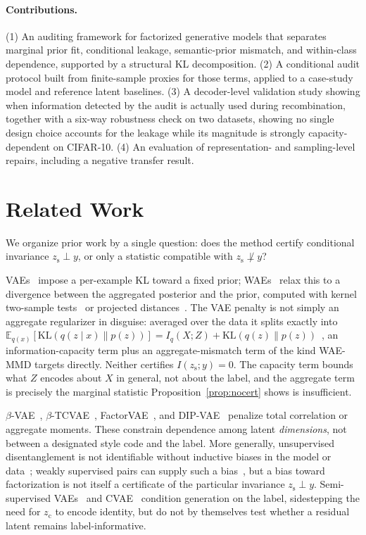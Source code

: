 \documentclass[letterpaper]{article}
\newcommand{\zc}{z_{\mathrm{c}}}
\newcommand{\zs}{z_{\mathrm{s}}}
\newcommand{\KL}{\mathrm{KL}}
\begin{document}
\paragraph{Contributions.}
(1) An auditing framework for factorized generative models that separates
marginal prior fit, conditional leakage, semantic-prior mismatch, and
within-class dependence, supported by a structural KL decomposition. (2) A
conditional audit protocol built from finite-sample proxies for those terms,
applied to a case-study model and reference latent baselines. (3) A
decoder-level validation study showing when information detected by the audit
is actually used during recombination, together with a
six-way robustness check on two datasets, showing no single design choice
accounts for the leakage while its magnitude is strongly capacity-dependent
on CIFAR-10. (4) An evaluation of representation- and sampling-level
repairs, including a negative transfer result.

\section{Related Work}

We organize prior work by a single question: does the method certify
conditional invariance $\zs\perp y$, or only a statistic compatible with
$\zs\not\perp y$?

VAEs~\citep{kingma2013autoencoding} impose a per-example KL toward a fixed
prior; WAEs~\citep{tolstikhin2017wasserstein} relax this to a divergence
between the aggregated posterior and the prior, computed with kernel
two-sample tests~\citep{gretton2012kernel} or projected
distances~\citep{kolouri2018sliced}. The VAE penalty is not simply an
aggregate regularizer in disguise: averaged over the data it splits exactly
into $\mathbb E_{q(x)}[\KL(q(z\mid x)\|p(z))] = I_q(X;Z) +
\KL(q(z)\|p(z))$~\citep{hoffman2016elbo}, an information-capacity term plus
an aggregate-mismatch term of the kind WAE-MMD targets directly. Neither
certifies $I(\zs;y)=0$. The capacity term bounds what $Z$ encodes about $X$
in general, not about the label, and the aggregate term is precisely the
marginal statistic Proposition~\ref{prop:nocert} shows is insufficient.

$\beta$-VAE~\citep{higgins2017beta}, $\beta$-TCVAE~\citep{chen2018isolating},
FactorVAE~\citep{kim2018disentangling}, and DIP-VAE~\citep{kumar2018dipvae}
penalize total correlation or aggregate moments. These constrain dependence
among latent \emph{dimensions}, not between a designated style code and the
label. More generally, unsupervised disentanglement is not identifiable
without inductive biases in the model or data~\citep{locatello2019challenging};
weakly supervised pairs can supply such a bias~\citep{locatello2020weakly},
but a bias toward factorization is not itself a certificate of the particular
invariance $\zs\perp y$. Semi-supervised VAEs~\citep{kingma2014semi} and
CVAE~\citep{sohn2015learning} condition generation on the label, sidestepping
the need for $\zc$ to encode identity, but do not by themselves test whether
a residual latent remains label-informative.
\end{document}
